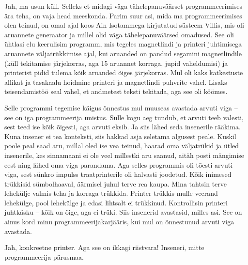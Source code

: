 
Jah, ma usun küll. Selleks et midagi väga tähelepanuväärset programmeerimises ära teha, on vaja 
head meeskonda. Parim suur asi, mida ma
programmeerimises olen teinud, on omal ajal koos Ain Isotammega kirjutatud süsteem Villis, mis oli aruannete 
generaator ja millel olid väga tähelepanuväärsed omadused. See oli ühtlasi elu 
keerulisim programm, mis tegeles magnetlindi ja printeri juhtimisega 
aruannete väljatrükkimise ajal, kui aruanded on pandud segamini magnetlindile (küll tekitamise järjekorras, aga 15 aruannet korraga, jupid vaheldumisi) 
ja printerist pidid tulema kõik aruanded õiges järjekorras. Mul oli kaks 
katkestuste allikat ja tasakaalu hoidmine printeri ja magnetlindi 
puhvrite vahel. Lisaks teisendamistöö seal vahel, et andmetest teksti 
tekitada, aga see oli köömes. 

Selle programmi tegemise käigus õnnestus mul 
muuseas avastada arvuti viga – see on iga programmeerija unistus. Sulle kogu 
aeg tundub, et arvuti teeb valesti, sest teed ise kõik õigesti, 
aga arvuti eksib. Ja siis lähed seda insenerile rääkima. Kuna 
insener ei tea konteksti, siis hakkad asja seletama
algusest peale. Kuskil poole peal saad aru, millal oled ise vea teinud, haarad oma väljatrükid ja 
ütled insenerile, kes sinnamaani ei ole veel millestki aru saanud, aitäh 
posti mängimise eest ning lähed oma viga parandama. Aga selles programmis oli tõesti
arvuti viga, sest sünkro impulss traatprinterile oli 
halvasti joodetud. Kõik inimesed trükkisid sümbolhaaval, äärmisel 
juhul terve rea kaupa. Mina tahtsin terve lehekülje valmis teha ja
korraga trükkida. Printer trükkis mulle veerand lehekülge, pool 
lehekülge ja edasi lihtsalt ei trükkinud. Kontrollisin printeri juhtkäsku – 
kõik on õige, aga ei trüki. Siis insenerid avastasid, 
milles asi. See on ainus kord minu programmeerijakarjääris, kui mul on õnnestunud 
arvuti viga avastada. 


Jah, konkreetne printer. Aga see on ikkagi riistvara! Inseneri, mitte programmeerija pärusmaa.


